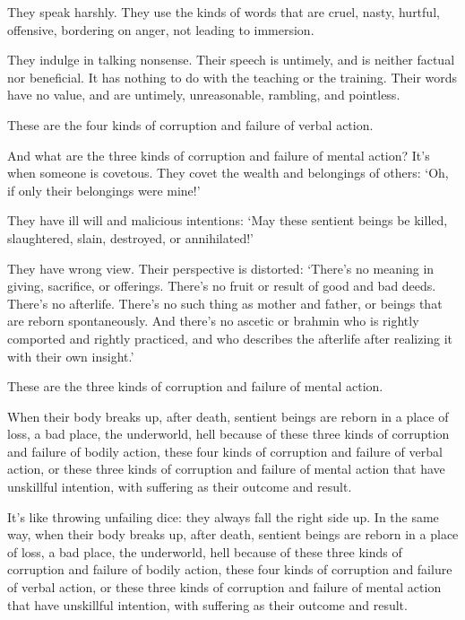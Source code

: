 \documentclass[12pt,openany]{book}%
\begin{document}
They speak harshly. They use the kinds of words that are cruel, nasty, hurtful, offensive, bordering on anger, not leading to immersion. 

They indulge in talking nonsense. Their speech is untimely, and is neither factual nor beneficial. It has nothing to do with the teaching or the training. Their words have no value, and are untimely, unreasonable, rambling, and pointless. 

These are the four kinds of corruption and failure of verbal action. 

And what are the three kinds of corruption and failure of mental action? It’s when someone is covetous. They covet the wealth and belongings of others: ‘Oh, if only their belongings were mine!’ 

They have ill will and malicious intentions: ‘May these sentient beings be killed, slaughtered, slain, destroyed, or annihilated!’ 

They have wrong view. Their perspective is distorted: ‘There’s no meaning in giving, sacrifice, or offerings. There’s no fruit or result of good and bad deeds. There’s no afterlife. There’s no such thing as mother and father, or beings that are reborn spontaneously. And there’s no ascetic or brahmin who is rightly comported and rightly practiced, and who describes the afterlife after realizing it with their own insight.’ 

These are the three kinds of corruption and failure of mental action. 

When their body breaks up, after death, sentient beings are reborn in a place of loss, a bad place, the underworld, hell because of these three kinds of corruption and failure of bodily action, these four kinds of corruption and failure of verbal action, or these three kinds of corruption and failure of mental action that have unskillful intention, with suffering as their outcome and result. 

It’s like throwing unfailing dice: they always fall the right side up. In the same way, when their body breaks up, after death, sentient beings are reborn in a place of loss, a bad place, the underworld, hell because of these three kinds of corruption and failure of bodily action, these four kinds of corruption and failure of verbal action, or these three kinds of corruption and failure of mental action that have unskillful intention, with suffering as their outcome and result. 
\end{document}
